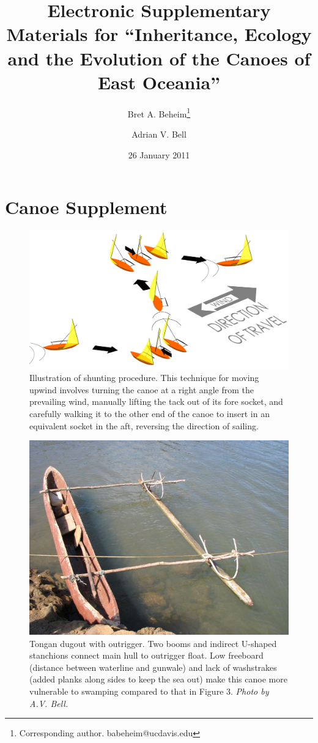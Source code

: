 \documentclass[11pt]{article}
\title{Electronic Supplementary Materials for ``Inheritance, Ecology and the Evolution of the Canoes of East Oceania''}
\author[,    1]{Bret A. Beheim\footnote{Corresponding author. babeheim@ucdavis.edu}}
\author[1]{Adrian V. Bell}
\affil[1]{Graduate Group in Ecology, Department of Environmental Science and Policy, University of California, Davis, USA}
\date{26 January 2011}
\begin{document}
\maketitle


\section{Canoe Supplement}

\begin{figure}[h]
\begin{center}
\includegraphics[scale=0.35]{figures/shunting.pdf}
\caption{Illustration of shunting procedure. This technique for moving upwind involves turning the canoe at a right angle from the prevailing wind, manually lifting the tack out of its fore socket, and carefully walking it to the other end of the canoe to insert in an equivalent socket in the aft, reversing the direction of sailing.}
\end{center}
\end{figure}

\begin{figure}[h]
\begin{center}
\includegraphics[scale=1.0]{figures/tonganOutrigger.jpg}
\caption{Tongan dugout with outrigger. Two booms and indirect U-shaped stanchions connect main hull to outrigger float. Low freeboard (distance between waterline and gunwale) and lack of washstrakes (added planks along sides to keep the sea out) make this canoe more vulnerable to swamping compared to that in Figure 3. \textit{Photo by A.V. Bell. }}
\end{center}
\end{figure}
\end{document}
